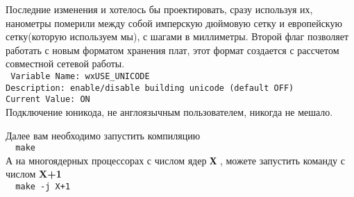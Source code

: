 Последние изменения и хотелось бы проектировать, сразу используя их, нанометры померили между собой имперскую дюймовую сетку и европейскую сетку(которую используем мы), с шагами в миллиметры. Второй флаг позволяет работать с новым форматом хранения плат, этот формат создается с рассчетом совместной сетевой работы.\\
\texttt{
Variable Name: wxUSE\_UNICODE\\
Description: enable/disable building unicode (default OFF)\\
Current Value: ON
}\\
Подключение юникода, не англоязычным пользователем, никогда не мешало.

Далее вам необходимо запустить компиляцию\\
\texttt{~ make}\\
А на многоядерных процессорах с числом ядер \textbf{Х} , можете запустить команду с числом \textbf{X+1}\\
\texttt{~ make -j X+1}


